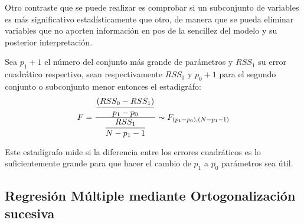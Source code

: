 \noindent Otro contraste que se puede realizar es comprobar si un subconjunto de variables es más significativo estadísticamente que otro, de manera que se pueda eliminar variables que no aporten información en pos de la sencillez del modelo y su posterior interpretación. 

\noindent Sea $p_1+1$ el número del conjunto más grande de parámetros y $RSS_1$ su error cuadrático respectivo, sean respectivamente $RSS_0$ y $p_0+1$ para el segundo conjunto o subconjunto menor entonces el estadigráfo:
\begin{equation}
F=\dfrac{\dfrac{(RSS_0-RSS_1)}{p_1-p_0}}{\dfrac{RSS_1}{N-p_1-1}} \thicksim F_{(p_1-p_0),(N-p_1-1)}
\end{equation}

\noindent Este estadígrafo mide si la diferencia entre los errores cuadráticos es lo suficientemente grande para que hacer el cambio de $p_1$ a $p_0$ parámetros sea útil. 

\subsection{Regresión Múltiple mediante Ortogonalización sucesiva }














